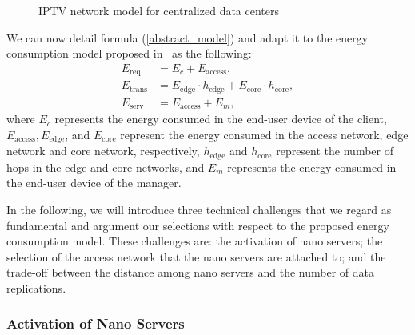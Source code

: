 \begin{figure}[h]
	\fontsize{12}{12} \selectfont
	\centerline{\resizebox{15cm}{!}{}}
	\caption{IPTV network model for centralized data centers~\cite{iptv}}
	\label{fig:ipnet}
	\normalsize
\end{figure}

We can now detail formula (\ref{abstract_model}) and adapt it to the energy consumption model proposed in~\cite{DBLP:journals/sigmetrics/JalaliAVHAT14} as the following:
\begin{align}
E_\text{req}&=E_{c}+E_\text{access},\\
E_\text{trans}&=E_\text{edge}\cdot h_\text{edge}+E_\text{core}\cdot h_\text{core},\\ \label{eq:trans}
E_\text{serv}&=E_\text{access}+ E_{m},
\end{align} 
where $E_c$ represents the energy consumed in the end-user device of the client, 
$E_\text{access}, E_\text{edge}$, and $E_\text{core}$ represent the energy consumed in the access network, edge network and core network, respectively, 
$h_\text{edge}$ and $h_\text{core}$ represent the number of hops in the edge and core networks,
and $E_m$ represents the energy consumed in the end-user device of the manager.

In the following, we will introduce three technical challenges that we regard as fundamental and argument our selections with respect to the proposed energy consumption model.
These challenges are:
the activation of nano servers;
the selection of the access network that the nano servers are attached to; 
and the trade-off between the distance among nano servers and the number of data replications.

\subsubsection{Activation of Nano Servers}

